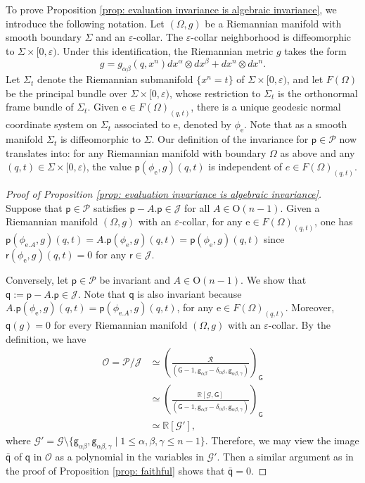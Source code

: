\documentclass[11pt]{amsart}
\newcommand{\Ogroup}[1]{\mathrm O({#1})}
\theoremstyle{definition}
\numberwithin{equation}{section}
\begin{document}
To prove Proposition \ref{prop: evaluation invariance is algebraic invariance}, we introduce the following notation. Let $(\Omega,g)$ be a Riemannian manifold with smooth boundary $\Sigma$ and an $\varepsilon$-collar. The $\varepsilon$-collar neighborhood is diffeomorphic to $\Sigma\times[0,\varepsilon)$. Under this identification, the Riemannian metric $g$ takes the form
\[g = g_{\alpha\beta}(q,x^n)dx^\alpha\otimes dx^\beta + dx^n\otimes dx^n.\]
Let $\Sigma_t$ denote the Riemannian submanifold $\{x^n = t\}$ of $\Sigma\times[0,\varepsilon)$, and let $F(\Omega)$ be the principal bundle over $\Sigma\times[0,\varepsilon)$, whose restriction to $\Sigma_t$ is the orthonormal frame bundle of $\Sigma_t$. Given $\mathrm e \in F(\Omega)_{(q,t)}$, there is a unique geodesic normal coordinate system on $\Sigma_t$ associated to $\mathrm e$, denoted by  $\phi_{\mathrm e}$. Note that as a smooth manifold $\Sigma_t$ is diffeomorphic to $\Sigma$. Our definition of the invariance for $\mathsf p\in\mathcal P$ now translates into: for any Riemannian manifold with boundary $\Omega$ as above and any $(q,t)\in\Sigma\times[0,\varepsilon)$, the value $\mathsf p(\phi_\mathrm e,g)(q,t)$ is independent of $e\in F(\Omega)_{(q,t)}$.
 

\begin{proof}[Proof of Proposition \ref{prop: evaluation invariance is algebraic invariance}]
    Suppose that $\mathsf p\in\mathcal P$ satisfies $\mathsf p - A.\mathsf p\in\mathcal J$ for all $A\in\Ogroup{n-1}$. Given a Riemannian manifold $(\Omega,g)$ with an $\varepsilon$-collar, for any $\mathrm e\in F(\Omega)_{(q,t)}$, one has $\mathsf p(\phi_{\mathrm e.A},g)(q,t) = A.\mathsf p(\phi_\mathrm e,g)(q,t) = \mathsf p(\phi_\mathrm e,g)(q,t)$ since $\mathsf r(\phi_\mathrm e,g)(q,t) = 0$ for any $\mathsf r\in\mathcal J$.
    
    Conversely, let $\mathsf p\in\mathcal P$ be invariant and $A\in\Ogroup{n-1}$. We show that $\mathsf q:= \mathsf p-A.\mathsf p\in\mathcal J$. Note that $\mathsf q$ is also invariant because $A.\mathsf p(\phi_\mathrm e,g)(q,t) = \mathsf p(\phi_{\mathrm e.A},g)(q,t)$, for any $\mathrm e\in F(\Omega)_{(q,t)}$. Moreover, $\mathsf q(g) = 0$ for every Riemannian manifold $(\Omega,g)$ with an $\varepsilon$-collar. By the definition, we have
    \begin{align*}
        \mathcal O = \mathcal P/\mathcal J & \simeq \left(\frac{\mathcal R}{(\mathsf G-1,\mathsf g_{\alpha\beta}-\delta_{\alpha\beta},\mathsf g_{\alpha\beta,\gamma})}\right)_\mathsf G\\
    	& \simeq\left(\frac{\mathbb R[\mathcal G,\mathsf G]}{(\mathsf G-1,\mathsf g_{\alpha\beta}-\delta_{\alpha\beta},\mathsf g_{\alpha\beta,\gamma})}\right)_\mathsf G\\
    	& \simeq\mathbb R[\mathcal G'],
    \end{align*} 
    where $\mathcal G' = \mathcal G\setminus\{\mathsf g_{\alpha\beta},\mathsf g_{\alpha\beta,\gamma}\mid 1\le\alpha,\beta,\gamma\le n-1\}$. Therefore, we may view the image $\bar{\mathsf q}$ of $\mathsf q$ in $\mathcal O$ as a polynomial in the variables in $\mathcal G'$. Then a similar argument as in the proof of Proposition \ref{prop: faithful} shows that $\bar{\mathsf q} = 0$.
\end{proof}
\end{document}
